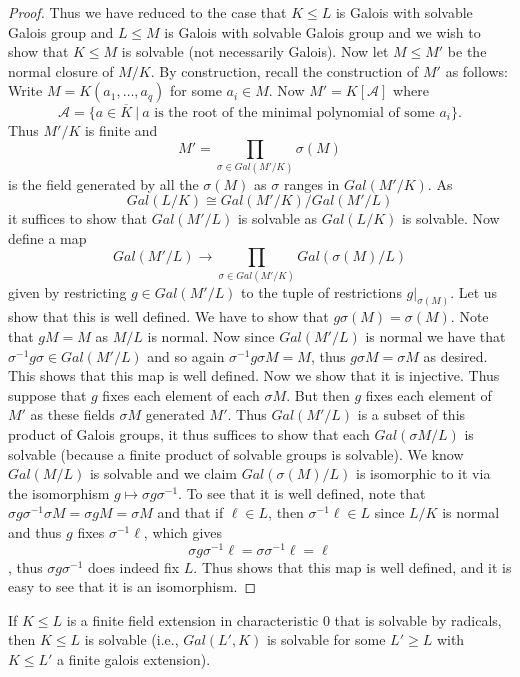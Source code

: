 \documentclass[twoside, a4paper, 10pt]{amsart}
\begin{document}
\begin{proof}
Thus we have reduced to the case that $K \leq L$ is Galois with solvable Galois group and $L \leq M$ is Galois with solvable Galois group and we wish to show that $K \leq M$ is solvable (not necessarily Galois). Now let $M \leq M'$ be the normal closure of $M/K$. By construction, recall the construction of $M'$ as follows: Write $M = K(a_1, \ldots, a_q)$ for some $a_i \in M$. Now $M' = K[\mathcal{A}]$ where $$\mathcal{A} = \{ a \in \overline{K} ~|~ a \text{ is the root of the minimal polynomial of some } a_i \}.$$ Thus $M'/K$ is finite and $$M' = \prod_{\sigma \in Gal(M'/K)} \sigma(M)$$ is the field generated by all the $\sigma(M)$ as $\sigma$ ranges in $Gal(M'/K)$. As $$Gal(L/K) \cong Gal(M'/K) / Gal(M'/L)$$ it suffices to show that $Gal(M'/L)$ is solvable as $Gal(L/K)$ is solvable. Now define a map $$Gal(M'/L) \to \prod_{\sigma \in Gal(M'/K)} Gal(\sigma(M)/L)$$ given by restricting $g \in Gal(M'/L)$ to the tuple of restrictions $g|_{\sigma(M)}$. Let us show that this is well defined. We have to show that $g \sigma(M) = \sigma(M)$. Note that $gM =M$ as $M/L$ is normal. Now since $Gal(M'/L)$ is normal we have that $\sigma^{-1} g \sigma \in Gal(M'/L)$ and so again $ \sigma^{-1} g \sigma M = M$, thus $g \sigma M = \sigma M$ as desired. This shows that this map is well defined. Now we show that it is injective. Thus suppose that $g$ fixes each element of each $\sigma M$. But then $g$ fixes each element of $M'$ as these fields $\sigma M$ generated $M'$. Thus $Gal(M'/L)$ is a subset of this product of Galois groups, it thus suffices to show that each $Gal(\sigma M/L)$ is solvable (because a finite product of solvable groups is solvable). We know $Gal(M/L)$ is solvable and we claim $Gal(\sigma(M)/L)$ is isomorphic to it via the isomorphism $g \mapsto \sigma g \sigma^{-1}$. To see that it is well defined, note that $\sigma g \sigma^{-1} \sigma M = \sigma gM = \sigma M$ and that if $\ell \in L$, then $\sigma^{-1} \ell \in L$ since $L/K$ is normal and thus $g$ fixes $\sigma^{-1}\ell$, which gives $$\sigma g \sigma^{-1} \ell = \sigma \sigma^{-1} \ell = \ell$$, thus $\sigma g \sigma^{-1}$ does indeed fix $L$. Thus shows that this map is well defined, and it is easy to see that it is an isomorphism. \end{proof}

\begin{thm} If $K \leq L$ is a finite field extension in characteristic $0$ that is solvable by radicals, then $K \leq L$ is solvable (i.e., $Gal(L',K)$ is solvable for some $L' \geq L$ with $K \leq L'$ a finite galois extension).

\end{thm}
\end{document}
